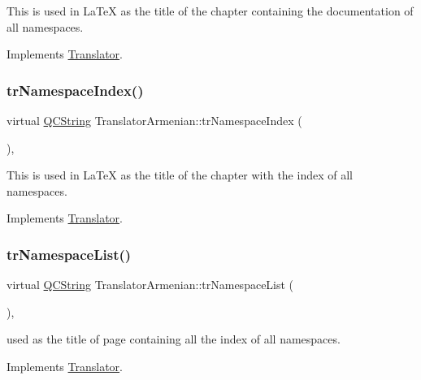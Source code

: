 This is used in La\+TeX as the title of the chapter containing the documentation of all namespaces. 

Implements \mbox{\hyperlink{class_translator}{Translator}}.

\mbox{\label{class_translator_armenian_a0cdb8ec3abaa9da0da09c81e39ce4236}} 
\subsubsection{\texorpdfstring{trNamespaceIndex()}{trNamespaceIndex()}}
{\footnotesize\ttfamily virtual \mbox{\hyperlink{class_q_c_string}{Q\+C\+String}} Translator\+Armenian\+::tr\+Namespace\+Index (\begin{DoxyParamCaption}{ }\end{DoxyParamCaption})\hspace{0.3cm}{\ttfamily [inline]}, {\ttfamily [virtual]}}

This is used in La\+TeX as the title of the chapter with the index of all namespaces. 

Implements \mbox{\hyperlink{class_translator}{Translator}}.

\mbox{\label{class_translator_armenian_ab37a0e7aec6e617c0e330ce7e8db75e5}} 
\subsubsection{\texorpdfstring{trNamespaceList()}{trNamespaceList()}}
{\footnotesize\ttfamily virtual \mbox{\hyperlink{class_q_c_string}{Q\+C\+String}} Translator\+Armenian\+::tr\+Namespace\+List (\begin{DoxyParamCaption}{ }\end{DoxyParamCaption})\hspace{0.3cm}{\ttfamily [inline]}, {\ttfamily [virtual]}}

used as the title of page containing all the index of all namespaces. 

Implements \mbox{\hyperlink{class_translator}{Translator}}.

\mbox{\label{class_translator_armenian_a07d8d1d0debe989ebeafbcb21e054409}} 
